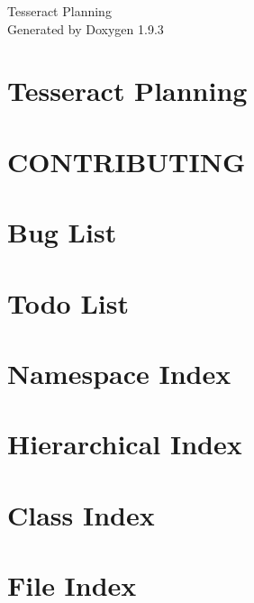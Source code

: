 \documentclass[twoside]{book}
\newcommand{\+}{\discretionary{\mbox{\scriptsize$\hookleftarrow$}}{}{}}
\newcommand{\clearemptydoublepage}{%
    \newpage{\pagestyle{empty}\cleardoublepage}%
  }
\begin{document}
  \raggedbottom
    \hypersetup{pageanchor=false,
                bookmarksnumbered=true,
                pdfencoding=unicode
               }
  \begin{titlepage}
  \vspace*{7cm}
  \begin{center}%
  {\Large Tesseract Planning}\\
  \vspace*{1cm}
  {\large Generated by Doxygen 1.9.3}\\
  \end{center}
  \end{titlepage}
  \clearemptydoublepage
  \tableofcontents
  \clearemptydoublepage
  \hypersetup{pageanchor=true}
\chapter{Tesseract Planning}
\label{index}\hypertarget{index}{}
\chapter{CONTRIBUTING}
\label{md_CONTRIBUTING}

\chapter{Bug List}
\label{bug}

\chapter{Todo List}
\label{todo}

\chapter{Namespace Index}

\chapter{Hierarchical Index}

\chapter{Class Index}

\chapter{File Index}

\end{document}
